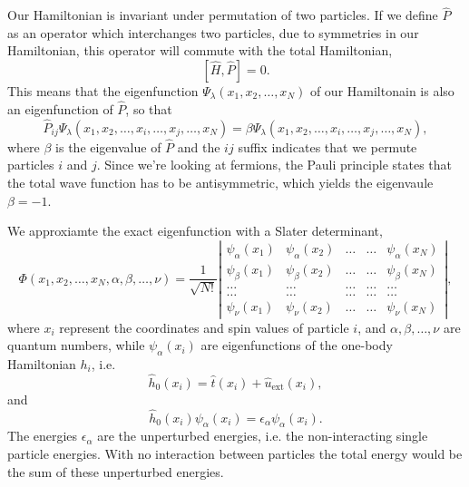 \documentclass[../main.tex]{subfiles}
\begin{document}
Our Hamiltonian is invariant under permutation of two particles. If we define $\hat{P}$ as an operator which interchanges two particles, due to symmetries in our Hamiltonian, this operator will commute with the total Hamiltonian,
\begin{equation}
    \left[ \hat{H}, \hat{P} \right] = 0.
\end{equation}
This means that the eigenfunction $\Psi_\lambda(x_1,x_2,\dots,x_N)$ of our Hamiltonain is also an eigenfunction of $\hat{P}$, so that
\begin{equation}
    \hat{P}_{ij}\Psi_\lambda(x_1,x_2,\dots,x_i,\dots,x_j,\dots,x_N) = \beta\Psi_\lambda(x_1,x_2,\dots,x_i,\dots,x_j,\dots,x_N),
\end{equation}
where $\beta$ is the eigenvalue of $\hat{P}$ and the $ij$ suffix indicates that we permute particles $i$ and $j$. Since we're looking at fermions, the Pauli principle states that the total wave function has to be antisymmetric, which yields the eigenvaule $\beta = -1$.

We approxiamte the exact eigenfunction with a Slater determinant,
\begin{equation}
    \Phi(x_1,x_2,\dots,x_N,\alpha,\beta,\dots,\nu) = \frac{1}{\sqrt{N!}}
    \left| \begin{array}{ccccc} \psi_\alpha(x_1) & \psi_\alpha(x_2) & \dots & \dots & \psi_\alpha(x_N)\\
                                \psi_\beta(x_1) & \psi_\beta(x_2) & \dots & \dots & \psi_\beta(x_N)\\
                                \dots & \dots & \dots & \dots & \dots\\
                                \dots & \dots & \dots & \dots & \dots\\
                                \psi_\nu(x_1) & \psi_\nu(x_2) & \dots & \dots & \psi_\nu(x_N)

             \end{array} \right|,
      \label{eq:SlaterDet}
\end{equation}
where $x_i$ represent the coordinates and spin values of particle $i$, and $\alpha,\beta,\dots,\nu$ are quantum numbers, while $\psi_\alpha(x_i)$ are eigenfunctions of the one-body Hamiltonian $h_i$, i.e.
\begin{equation}
    \hat{h}_0(x_i) = \hat{t}(x_i) + \hat{u}_\textrm{ext}(x_i),
\end{equation}
and
\begin{equation}
    \hat{h}_0(x_i)\psi_\alpha(x_i) = \epsilon_\alpha\psi_\alpha(x_i).
\end{equation}
The energies $\epsilon_\alpha$ are the unperturbed energies, i.e. the non-interacting single particle energies. With no interaction between particles the total energy would be the sum of these unperturbed energies.
\end{document}
